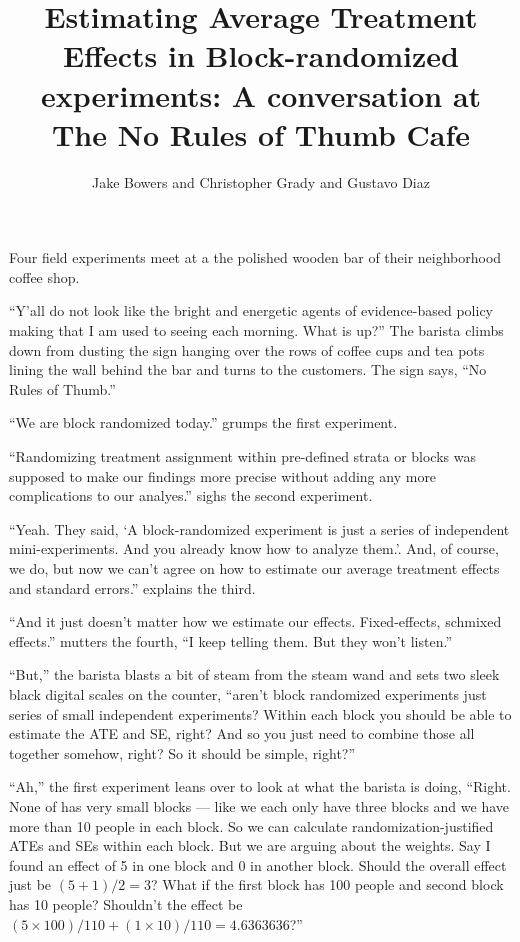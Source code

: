 \documentclass[
]{article}
\title{Estimating Average Treatment Effects in Block-randomized experiments: A conversation at The No Rules of Thumb Cafe}
\author{Jake Bowers and Christopher Grady and Gustavo Diaz}
\date{}
\begin{document}
\maketitle

{
\setcounter{tocdepth}{2}
\tableofcontents
}
Four field experiments meet at a the polished wooden bar of their neighborhood coffee shop.

``Y'all do not look like the bright and energetic agents of evidence-based
policy making that I am used to seeing each morning. What is up?'' The barista
climbs down from dusting the sign hanging over the rows of coffee cups and tea
pots lining the wall behind the bar and turns to the customers. The sign says,
``No Rules of Thumb.''

``We are block randomized today.'' grumps the first experiment.

``Randomizing treatment assignment within pre-defined strata or blocks was
supposed to make our findings more precise without adding any more
complications to our analyes.'' sighs the second experiment.

``Yeah. They said, `A block-randomized experiment is just a series of
independent mini-experiments. And you already know how to analyze them.'. And,
of course, we do, but now we can't agree on how to estimate our average
treatment effects and standard errors.'' explains the third.

``And it just doesn't matter how we estimate our effects. Fixed-effects,
schmixed effects.'' mutters the fourth, ``I keep telling them. But they won't
listen.''

``But,'' the barista blasts a bit of steam from the steam wand and sets two sleek
black digital scales on the counter, ``aren't block randomized experiments just
series of small independent experiments? Within each block you should be able
to estimate the ATE and SE, right? And so you just need to combine those all
together somehow, right? So it should be simple, right?''

``Ah,'' the first experiment leans over to look at what the barista is doing, ``Right. None of has very small blocks --- like we each only have three blocks and we have more than 10 people in each block. So we can calculate randomization-justified ATEs and SEs within each block. But we are arguing about the weights. Say I found an effect of 5 in one block and 0 in another block. Should the overall effect just be \((5+1)/2=3\)? What if the first block has 100 people and second block has 10 people? Shouldn't the effect be \((5 \times 100)/110 + (1 \times 10)/110 = 4.6363636\)?''
\end{document}
